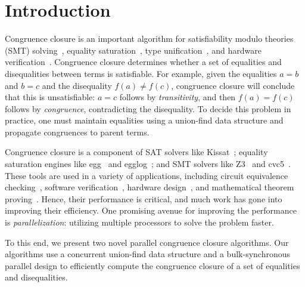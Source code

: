 \section{Introduction}
\label{sec:intro}

Congruence closure is an important algorithm for satisfiability modulo theories
(SMT) solving~\cite{smt}, equality saturation~\cite{eqsat}, type
unification~\cite{unification}, and hardware verification~\cite{clausal-cc}.
Congruence closure determines whether a set of equalities and disequalities
between terms is satisfiable. For example, given the equalities $a = b$ and
$b = c$ and the disequality $f(a) \neq f(c)$, congruence closure will
conclude that this is unsatisfiable: $a = c$ follows by \emph{transitivity},
and then $f(a) = f(c)$ follows by \emph{congruence}, contradicting the
disequality. To decide this problem in practice, one must maintain
equalities using a union-find data structure and propagate congruences to
parent terms.



Congruence closure is a component of SAT solvers like Kissat~\cite{kissat};
equality saturation engines like egg~\cite{egg} and egglog~\cite{egglog}; and
SMT solvers like Z3~\cite{z3} and cvc5~\cite{cvc5}. These tools are used in a
variety of applications, including circuit equivalence
checking~\cite{clausal-cc}, software verification~\cite{dafny,verus}, hardware
design~\cite{hardware}, and mathematical theorem proving~\cite{lean-grind}.
Hence, their performance is critical, and much work has gone into improving
their efficiency. One promising avenue for improving the performance is
\emph{parallelization}: utilizing multiple processors to solve the problem
faster. 

To this end, we present two novel parallel congruence closure algorithms. Our
algorithms use a concurrent union-find data structure and a bulk-synchronous
parallel design to efficiently compute the congruence closure of a set of
equalities and disequalities.


